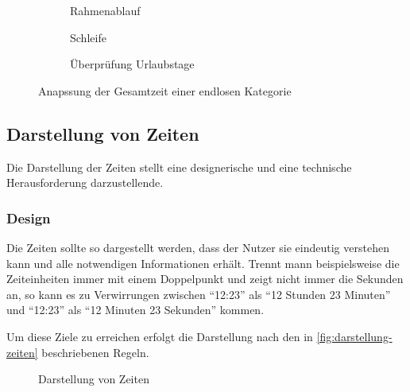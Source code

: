 \begin{figure}
    \begin{subfigure}{0.5\textwidth}
        \resizebox{0.9\linewidth}{!}{
            
        }
		\caption{Rahmenablauf}
	\end{subfigure}
	\begin{subfigure}{0.5\textwidth}
        \resizebox{0.9\linewidth}{!}{
            
        }
		\caption{Schleife}
    \end{subfigure}
    \begin{subfigure}{\textwidth}
        \resizebox{\linewidth}{!}{
            
        }
		\caption{Überprüfung Urlaubstage}
	\end{subfigure}
	\caption{Anapssung der Gesamtzeit einer endlosen Kategorie}
	\label{fig:anpassung-endlos}
\end{figure}


\subsection{Darstellung von Zeiten}
Die Darstellung der Zeiten stellt eine designerische und eine technische Herausforderung darzustellende.

\subsubsection{Design}
Die Zeiten sollte so dargestellt werden,
dass der Nutzer sie eindeutig verstehen kann und alle notwendigen Informationen erhält.
Trennt mann beispielsweise die Zeiteinheiten immer mit einem Doppelpunkt und zeigt nicht immer die Sekunden an,
so kann es zu Verwirrungen zwischen \enquote{12:23} als \enquote{12 Stunden 23 Minuten}
und \enquote{12:23} als \enquote{12 Minuten 23 Sekunden} kommen.

Um diese Ziele zu erreichen erfolgt die Darstellung nach den in \autoref{fig:darstellung-zeiten} beschriebenen Regeln.

\begin{figure}[ht!]
    \centering
    \resizebox{\textwidth}{!}{
        
    }
    \caption{Darstellung von Zeiten}
    \label{fig:darstellung-zeiten}
\end{figure}


